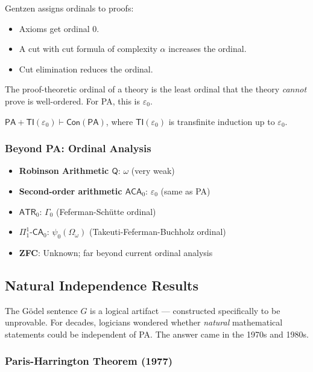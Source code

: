 Gentzen assigns ordinals to proofs:
\begin{itemize}
\item Axioms get ordinal 0.
\item A cut with cut formula of complexity $\alpha$ increases the ordinal.
\item Cut elimination reduces the ordinal.
\end{itemize}

The proof-theoretic ordinal of a theory is the least ordinal that the theory \emph{cannot} prove is well-ordered. For PA, this is $\varepsilon_0$.

\begin{theorem}[Gentzen 1936]
$\mathsf{PA} + \mathsf{TI}(\varepsilon_0) \vdash \mathsf{Con}(\mathsf{PA})$, where $\mathsf{TI}(\varepsilon_0)$ is transfinite induction up to $\varepsilon_0$.
\end{theorem}

\subsubsection*{Beyond PA: Ordinal Analysis}

\begin{itemize}
\item \textbf{Robinson Arithmetic $\mathsf{Q}$}: $\omega$ (very weak)
\item \textbf{Second-order arithmetic $\mathsf{ACA}_0$}: $\varepsilon_0$ (same as PA)
\item \textbf{$\mathsf{ATR}_0$}: $\Gamma_0$ (Feferman-Schütte ordinal)
\item \textbf{$\Pi^1_1\text{-}\mathsf{CA}_0$}: $\psi_0(\Omega_\omega)$ (Takeuti-Feferman-Buchholz ordinal)
\item \textbf{ZFC}: Unknown; far beyond current ordinal analysis
\end{itemize}

\subsection{Natural Independence Results}
\label{sec:godel:natural}

The Gödel sentence $G$ is a logical artifact --- constructed specifically to be unprovable. For decades, logicians wondered whether \emph{natural} mathematical statements could be independent of PA. The answer came in the 1970s and 1980s.

\subsubsection*{Paris-Harrington Theorem (1977)}

